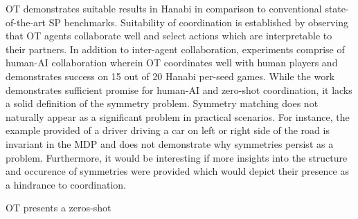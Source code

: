 \documentclass[11pt,letterpaper]{article}
\begin{document}
OT demonstrates suitable results in Hanabi in comparison to conventional state-of-the-art SP benchmarks. Suitability of coordination is established by observing that OT agents collaborate well and select actions which are interpretable to their partners. In addition to inter-agent collaboration, experiments comprise of human-AI collaboration wherein OT coordinates well with human players and demonstrates success on 15 out of 20 Hanabi per-seed games. While the work demonstrates sufficient promise for human-AI and zero-shot coordination, it lacks a solid definition of the symmetry problem. Symmetry matching does not naturally appear as a significant problem in practical scenarios. For instance, the example provided of a driver driving a car on left or right side of the road is invariant in the MDP and does not demonstrate why symmetries persist as a problem. Furthermore, it would be interesting if more insights into the structure and occurence of symmetries were provided which would depict their presence as a hindrance to coordination. 

OT presents a zeros-shot 
\end{document}
